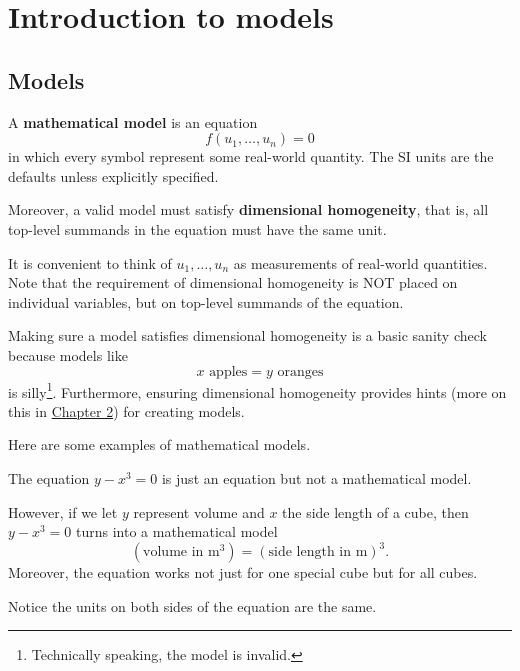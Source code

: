 \documentclass[../book.tex]{subfiles}
\begin{document}
\chapter{Introduction to models}\label{ch:models}

\section{Models}
\begin{definition} \label{def:model}
A \textbf{mathematical model} is an equation
\begin{equation}\label{eq:models-1}
f( u_1, \ldots , u_n ) = 0
\end{equation}
in which every symbol represent some real-world quantity. The SI units are the defaults unless explicitly specified.

Moreover, a valid model must satisfy \textbf{dimensional homogeneity}, that is, all top-level summands in the equation must have the same unit.
\end{definition}

It is convenient to think of \(u_{1}, \dots, u_{n}\) as measurements of real-world quantities.  Note that the requirement of dimensional homogeneity is NOT placed on individual variables, but on top-level summands of the equation.

Making sure a model satisfies dimensional homogeneity is a basic sanity check because models like
\begin{equation}\label{eq:models-2}
x \text{ apples} = y \text{ oranges}
\end{equation}
is silly\footnote{Technically speaking, the model is invalid.}. Furthermore, ensuring dimensional homogeneity provides hints (more on this in \hyperref[ch:de]{Chapter 2}) for creating models.

Here are some examples of mathematical models.

\begin{example} \label{eg:model-volume-cube}
The equation \(y - x^{3} = 0\) is just an equation but not a mathematical model.

However, if we let \(y\) represent volume and \(x\) the side length of a cube, then \(y - x^{3} = 0\) turns into a mathematical model
\begin{equation}\label{eq:model-cube}
(\text{volume in } \text{m}^{3}) = (\text{side length in m})^{3}.
\end{equation}
Moreover, the equation works not just for one special cube but for all cubes.

Notice the units on both sides of the equation are the same.
\end{example}
\end{document}
